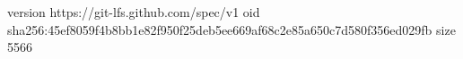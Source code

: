 version https://git-lfs.github.com/spec/v1
oid sha256:45ef8059f4b8bb1e82f950f25deb5ee669af68c2e85a650c7d580f356ed029fb
size 5566
